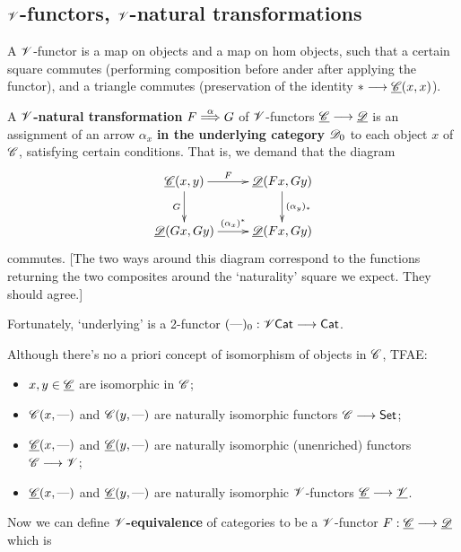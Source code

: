 \documentclass[11pt]{article}
\begin{document}
\begin{4. Basic concepts in enriched category theory}
\subsection*{$\mathscr{V}$-functors, $\mathscr{V}$-natural transformations}
\begin{itemise}
\setlength{\parindent}{.25in}
\item A $\mathscr{V}$-functor is a map on objects and a map on hom objects, such that a certain square commutes (performing composition before ander after applying the functor), and a triangle commutes (preservation of the identity $*\longrightarrow\underline{\mathscr{C}}(x,x)$).
\item A \textbf{$\mathscr{V}$-natural transformation} $F\overset{\alpha}{\Longrightarrow}G$ of $\mathscr{V}$-functors $\underline{\mathscr{C}}\longrightarrow\underline{\mathscr{D}}$ is an assignment of an arrow $\alpha_x$ \textbf{{in the underlying category $\mathscr{D}_0$}} to each object $x$ of $\mathscr{C}$, satisfying certain conditions. That is, we demand that the diagram
\[\xymatrix{
\underline{\scrC}(x,y)
\ar[r]^-{F}
\ar[d]_-{G}
&%
\underline{\scrD}(Fx,Gy)
\ar[d]^-{(\alpha_y)_*}
\\%
\underline{\scrD}(Gx,Gy)
\ar[r]^-{(\alpha_x)^*}
&%
\underline{\scrD}(Fx,Gy)%
}\]
commutes. [The two ways around this diagram correspond to the functions returning the two composites around the `naturality' square we expect. They should agree.]
\item Fortunately, `underlying' is a 2-functor $(\textup{---} )_0:\mathscr{V}\mathsf{Cat}\longrightarrow\mathsf{Cat}$.
\item Although there's no a priori concept of isomorphism of objects in $\mathscr{C}$, TFAE:
\begin{itemize}\squishlist
\setlength{\parindent}{.25in}
\item $x,y\in\underline{\mathscr{C}}$ are isomorphic in $\mathscr{C}$;
\item $\mathscr{C}(x,\textup{---} )$ and $\mathscr{C}(y,\textup{---} )$ are naturally isomorphic functors $\mathscr{C}\longrightarrow\operatorname{{\mathsf{Set}}}$;
\item  $\underline{\mathscr{C}}(x,\textup{---} )$ and $\underline{\mathscr{C}}(y,\textup{---} )$ are naturally isomorphic (unenriched) functors $\mathscr{C}\longrightarrow\mathscr{V}$;
\item  $\underline{\mathscr{C}}(x,\textup{---} )$ and $\underline{\mathscr{C}}(y,\textup{---} )$ are naturally isomorphic $\mathscr{V}$-functors $\underline{\mathscr{C}}\longrightarrow\underline{\mathscr{V}}$.
\end{itemize}
\item Now we can define \textbf{$\mathscr{V}$-equivalence} of categories to be a $\mathscr{V}$-functor $F:\underline{\mathscr{C}}\longrightarrow\underline{\mathscr{D}}$ which is
\begin{itemize}\squishlist

\end{itemize}
\end{itemise}
\end{4. Basic concepts in enriched category theory}
\end{document}

